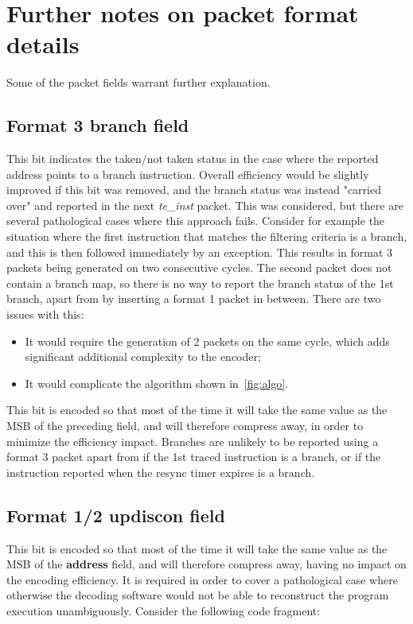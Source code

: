 \section {Further notes on packet format details}

Some of the packet fields warrant further explanation.

\subsection{Format 3 \textbf{branch} field}

This bit indicates the taken/not taken status in the case where the reported address points to a branch instruction.
Overall efficiency would be slightly improved if this bit was removed, and the branch status was instead 
"carried over" and reported in the next \textit{te\_inst} packet.  This was considered, but there are several
pathological cases where this approach fails.  Consider for example the situation where the first instruction
that matches the filtering criteria is a branch, and this is then followed immediately by an exception.  This
results in format 3 packets being generated on two consecutive cycles.  The second packet does not contain a branch
map, so there is no way to report the branch status of the 1st branch, apart from by inserting a format 1 packet in 
between.  There are two issues with this:

\begin{itemize}
  \item It would require the generation of 2 packets on the same cycle, which adds significant additional complexity
    to the encoder;
  \item It would complicate the algorithm shown in~\ref{fig:algo}. 
\end{itemize}

This bit is encoded so that most of the time it will take the same value as the MSB of the preceding field, and will
therefore compress away, in order to minimize the efficiency impact.  Branches are unlikely to be reported using a
format 3 packet apart from if the 1st traced instruction is a branch, or if the instruction reported when the 
resync timer expires is a branch.

\subsection{Format 1/2 \textbf{updiscon} field}

This bit is encoded so that most of the time it will take the same value as the MSB of the \textbf{address} field,
and will therefore compress away, having no impact on the encoding efficiency.  It is required in order to cover a
pathological case where otherwise the decoding software would not be able to reconstruct the program execution
unambiguously.  Consider the following code fragment:


